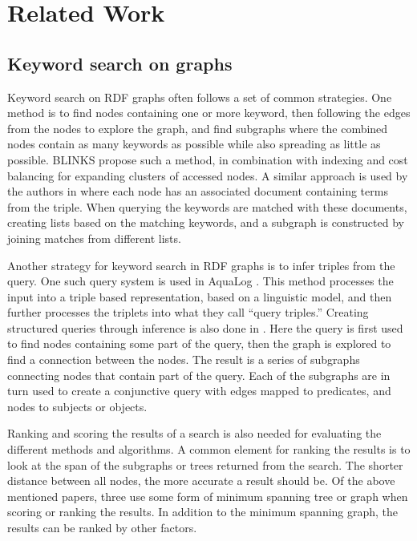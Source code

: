 \chapter{Related Work}
\label{cha:related_work}
\section{Keyword search on graphs}
Keyword search on RDF graphs often follows a set of common strategies. One method is to find nodes containing one or more keyword, then following the edges from the nodes to explore the graph, and find subgraphs where the combined nodes contain as many keywords as possible while also spreading as little as possible. BLINKS \citep{blinks} propose such a method, in combination with indexing and cost balancing for expanding clusters of accessed nodes. A similar approach is used by the authors in \citep{Elbassuoni:2011:KSO:2063576.2063615} where each node has an associated document containing terms from the triple. When querying the keywords are matched with these documents, creating lists based on the matching keywords, and a subgraph is constructed by joining matches from different lists.

Another strategy for keyword search in RDF graphs is to infer triples from the query. One such query system is used in AquaLog \citep{aqualog}. This method processes the input into a triple based representation, based on a linguistic model, and then further processes the triplets into what they call ``query triples.'' Creating structured queries through inference is also done in \citep{4812421}. Here the query is first used to find nodes containing some part of the query, then the graph is explored to find a connection between the nodes. The result is a series of subgraphs connecting nodes that contain part of the query. Each of the subgraphs are in turn used to create a conjunctive query with edges mapped to predicates, and nodes to subjects or objects.

Ranking and scoring the results of a search is also needed for evaluating the different methods and algorithms. A common element for ranking the results is to look at the span of the subgraphs or trees returned from the search. The shorter distance between all nodes, the more accurate a result should be. Of the above mentioned papers, three \citep{blinks, Elbassuoni:2011:KSO:2063576.2063615, 4812421} use some form of minimum spanning tree or graph when scoring or ranking the results. In addition to the minimum spanning graph, the results can be ranked by other factors. 

